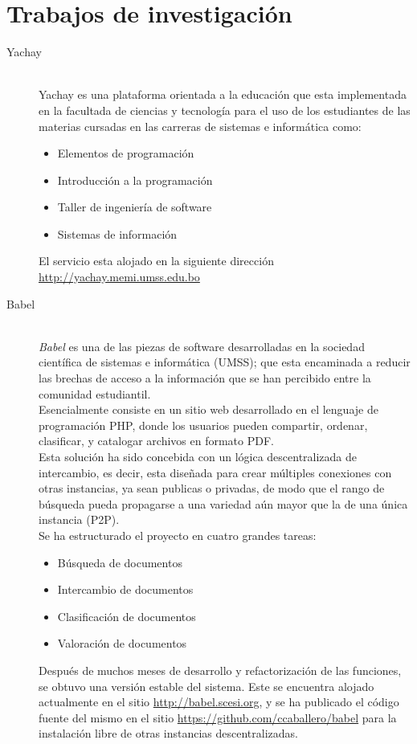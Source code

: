 \documentclass[11pt,letterpaper]{article}
\begin{document}
\section{Trabajos de investigación}
\begin{description}
	\item[Yachay]~\\
		Yachay es una plataforma orientada a la educación que esta implementada en la facultada de ciencias y tecnología para el uso de los estudiantes de las materias cursadas en las carreras de sistemas e informática como:
		\begin{itemize}
			\item Elementos de programación 
			\item Introducción a la programación
			\item Taller de ingeniería de software
			\item Sistemas de información
		\end{itemize}
		El servicio esta alojado en la siguiente dirección \url{http://yachay.memi.umss.edu.bo}
	\item[Babel]~\\
		\emph{Babel} es una de las piezas de software desarrolladas en la sociedad científica de sistemas e informática (UMSS); que esta encaminada a reducir las brechas de acceso a la información que se han percibido entre la comunidad estudiantil.\\
		Esencialmente consiste en un sitio web desarrollado en el lenguaje de programación PHP, donde los usuarios pueden compartir, ordenar, clasificar, y catalogar archivos en formato PDF.\\
		Esta solución ha sido concebida con un lógica descentralizada de intercambio, es decir, esta diseñada para crear múltiples conexiones con otras instancias, ya sean publicas o privadas, de modo que el rango de búsqueda pueda propagarse a una variedad aún mayor que la de una única instancia (P2P).\\
		Se ha estructurado el proyecto en cuatro grandes tareas:
		\begin{itemize}
			\item Búsqueda de documentos
			\item Intercambio de documentos
			\item Clasificación de documentos
			\item Valoración de documentos
		\end{itemize}
		Después de muchos meses de desarrollo y refactorización de las funciones, se obtuvo una versión estable del sistema. Este se encuentra alojado actualmente en el sitio \url{http://babel.scesi.org}, y se ha publicado el código fuente del mismo en el sitio \url{https://github.com/ccaballero/babel} para la instalación libre de otras instancias descentralizadas.

\end{description}
\end{document}
